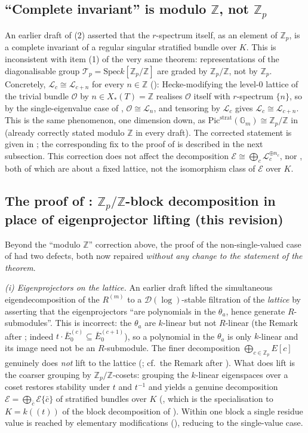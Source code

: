 \documentclass[11pt,reqno]{amsart}
\newcommand{\Zp}{\mathbb{Z}_p}
\newcommand{\ZZ}{\mathbb{Z}}
\newcommand{\GG}{\mathbb{G}}
\newcommand{\cO}{\mathcal{O}}
\newcommand{\cD}{\mathcal{D}}
\newcommand{\cE}{\mathcal{E}}
\newcommand{\cL}{\mathcal{L}}
\newcommand{\cT}{\mathcal{T}}
\newcommand{\strat}{\mathrm{strat}}
\newcommand{\Pic}{\mathrm{Pic}}
\newcommand{\Spec}{\mathrm{Spec}}
\newcommand{\Xst}{X_*(T)}
\theoremstyle{plain}
\theoremstyle{definition}
\theoremstyle{remark}
\numberwithin{equation}{section}
\begin{document}
\subsection{``Complete invariant'' is modulo $\ZZ$, not $\Zp$}
An earlier draft of (2) asserted that the
$r$-spectrum itself, as an element of $\Zp$, is a complete invariant of a
regular singular stratified bundle over $K$.  This is inconsistent with
item (1) of the very same theorem: representations of the diagonalisable
group $\cT_p=\Spec k[\Zp/\ZZ]$ are graded by $\Zp/\ZZ$, not by $\Zp$.
Concretely, $\cL_c\cong\cL_{c+n}$ for every $n\in\ZZ$ ():
Hecke-modifying the level-$0$ lattice of the trivial bundle $\cO$ by
$n\in\Xst=\ZZ$ realises $\cO$ itself with $r$-spectrum $\{n\}$, so by the
single-eigenvalue case of , $\cO\cong\cL_n$, and
tensoring by $\cL_c$ gives $\cL_c\cong\cL_{c+n}$.  This is the same
phenomenon, one dimension down, as $\Pic^{\strat}(\GG_m)\cong\Zp/\ZZ$ in
 (already correctly stated modulo $\ZZ$ in every draft).
The corrected statement is given in ; the
corresponding fix to the proof of  is described
in the next subsection.  This correction does not
affect the decomposition $\cE\cong\bigoplus_c\cL_c^{\oplus n_c}$, nor
, both of which are about a fixed lattice, not the
isomorphism class of $\cE$ over $K$.

\subsection{The proof of : $\Zp/\ZZ$-block
decomposition in place of eigenprojector lifting (this revision)}
Beyond the ``modulo $\ZZ$'' correction above, the proof of the
non-single-valued case of  had two defects, both
now repaired \emph{without any change to the statement of the theorem}.

\emph{(i) Eigenprojectors on the lattice.}  An earlier draft lifted the
simultaneous eigendecomposition of the $R^{(m)}$ to a
$\cD(\log)$-stable filtration of the \emph{lattice} by asserting that the
eigenprojectors ``are polynomials in the $\theta_a$, hence generate
$R$-submodules''.  This is incorrect: the $\theta_a$ are $k$-linear but
not $R$-linear (the Remark after ; indeed
$t\cdot\bar E_0^{(c)}\subseteq\bar E_0^{(c+1)}$), so a polynomial in the
$\theta_a$ is only $k$-linear and its image need not be an $R$-submodule.
The finer decomposition $\bigoplus_{c\in\Zp}E[c]$ genuinely does
\emph{not} lift to the lattice (; cf.\ the Remark after
).  What does lift is the coarser grouping by
$\Zp/\ZZ$-cosets: grouping the $k$-linear eigenspaces over a coset
restores stability under $t$ and $t^{-1}$ and yields a genuine
decomposition $\cE=\bigoplus_{\bar c}\cE\{\bar c\}$ of stratified bundles
over $K$ (, which is the specialisation to $K=k((t))$ of
the block decomposition of ).  Within one block a single
residue value is reached by elementary modifications (),
reducing to the single-value case.
\end{document}
